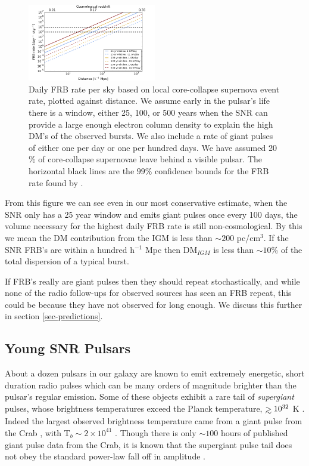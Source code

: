 \documentclass[useAMS,usenatbib]{mn2e}
\def\gtrsim{\mathrel{\hbox{\rlap{\hbox{\lower4pt\hbox{$\sim$}}}\hbox{$>$}}}}
\begin{document}
\begin{figure}
  \centering
   \includegraphics[width=0.5\textwidth]{FRB_SNR_rate.png}
   \caption{Daily FRB rate per sky based on local core-collapse supernova 
   event rate, plotted against distance.
   We assume early in the pulsar's life there is a window, either 
   25, 100, or 500 years when the SNR can provide a large enough electron 
   column density to explain the high DM's of the observed bursts. We also
   include a rate of giant pulses of either one per day or one per hundred
   days. We have assumed 20$\%$ of core-collapse supernovae leave behind
   a visible pulsar.
   The horizontal black lines are the $99\%$ confidence bounds for the FRB rate
   found by \cite{2015arXiv150500834R}.}
   \label{FIG-RATE}
\end{figure}

From this figure we can see even in our most conservative estimate, when
the SNR only has a 25 year window and emits giant pulses once every
100 days, the volume necessary for the highest daily FRB rate is still non-cosmological.
By this we mean the DM contribution from the IGM is less than $\sim 200$ pc/cm$^3$.
If the SNR FRB's are within a hundred h$^{-1}$ Mpc then DM$_{IGM}$ is less than 
$\sim 10 \%$  of the total dispersion of a typical burst.

If FRB's really are giant pulses then they 
should repeat stochastically, and while none of the radio follow-ups for
observed sources has seen an FRB repeat, this could be because they
have not observed for long enough. We discuss this further in section 
\ref{sec-predictions}.

\subsection{Young SNR Pulsars}

About a dozen pulsars in our galaxy are known to emit extremely energetic,
short duration radio pulses which can be many orders of magnitude 
brighter than the pulsar's regular emission. Some of these objects exhibit 
a rare tail of \textit{supergiant} pulses, whose brightness temperatures 
exceed the Planck temperature, $\gtrsim10^{32}$ K \citep{2004ApJ...612..375C}.
Indeed the largest
observed brightness temperature came from a giant pulse from the Crab
, with T$_b\sim2\times10^{41}$  \citep{2014ApJ...792..135T}. Though there
is only $\sim100$ hours of published giant pulse data from the Crab, it is known
that the supergiant pulse tail does not obey the standard power-law fall off
in amplitude \citep{2012ApJ...760...64M}.
\end{document}
